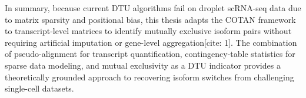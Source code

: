 In summary, because current DTU algorithms fail on droplet scRNA-seq data due to matrix sparsity and positional bias, this thesis adapts the COTAN framework to transcript-level matrices to identify mutually exclusive isoform pairs without requiring artificial imputation or gene-level aggregation[cite: 1]. The combination of pseudo-alignment for transcript quantification, contingency-table statistics for sparse data modeling, and mutual exclusivity as a DTU indicator provides a theoretically grounded approach to recovering isoform switches from challenging single-cell datasets.
